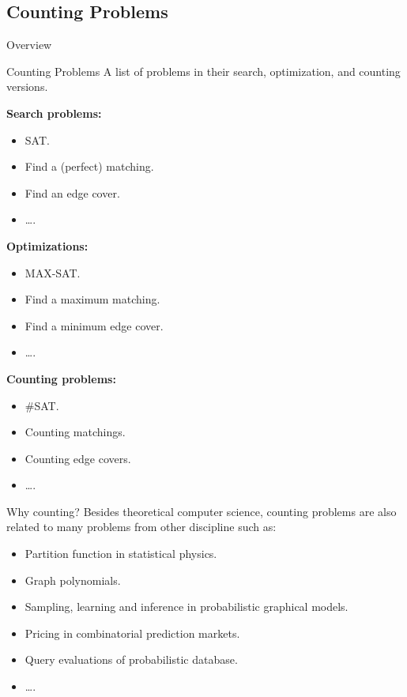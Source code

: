 \documentclass[mathserif]{beamer}
\begin{document}
\subsection{Counting Problems}
\begin{frame}{Overview}
	\tableofcontents[currentsubsection, hideothersubsections, sectionstyle=show/shaded, subsectionstyle=show/shaded]
\end{frame}
\begin{frame}{Counting Problems}
	A list of problems in their search, optimization, and counting versions.
	\bigskip

	\begin{minipage}[tb]{0.3\linewidth}
		{\bf Search problems:}
		\begin{itemize}
			\item SAT.
			\item Find a (perfect) matching.
			\item Find an edge cover.
			\item \dots.
		\end{itemize}
	\end{minipage}
	\pause
	\begin{minipage}[tb]{0.3\linewidth}
		{\bf Optimizations:}
		\begin{itemize}
			\item MAX-SAT.
			\item Find a maximum matching.
			\item Find a minimum edge cover.
			\item \dots.
		\end{itemize}
	\end{minipage}
	\pause
	\begin{minipage}[tb]{0.3\linewidth}
		{\bf Counting problems:}
		\begin{itemize}
			\item \#SAT.
			\item Counting matchings.
			\item\alert{Counting edge covers}.
			\item \dots.
		\end{itemize}
	\end{minipage}
\end{frame}

\begin{frame}{Why counting?}
Besides theoretical computer science, counting problems are also related to many problems from other discipline such as:
\begin{itemize}
	\item Partition function in statistical physics.
		\pause
	\item Graph polynomials.
		\pause
	\item Sampling, learning and inference in probabilistic graphical models.
		\pause
    \item Pricing in combinatorial prediction markets.
	\item Query evaluations of probabilistic database.
	\item \dots.
\end{itemize}
\end{frame}
\end{document}
